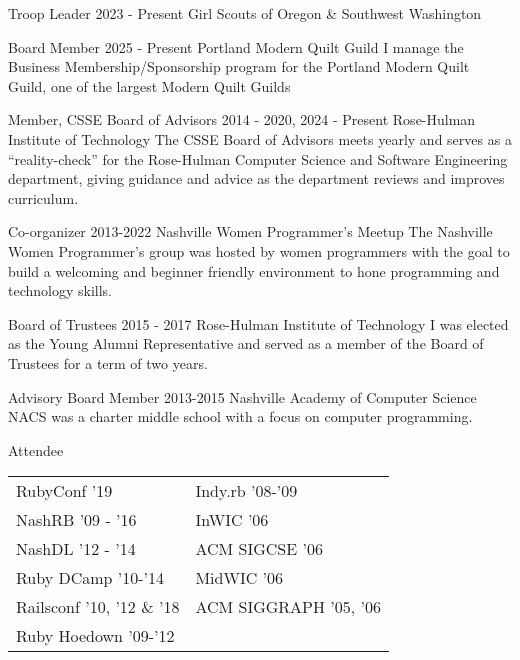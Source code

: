 
\begin{cventries}
  \cventry
    {Troop Leader}
    {2023 - Present}
    {Girl Scouts of Oregon \& Southwest Washington}
    {}
    {}

  \cventrywithcompanynote
    {Board Member}
    {2025 - Present }
    {Portland Modern Quilt Guild}
    {I manage the Business Membership/Sponsorship program for the Portland Modern Quilt Guild, one of the largest Modern Quilt Guilds}
    {}
    {}

  \cventrywithcompanynote
    {Member, CSSE Board of Advisors}
    {2014 - 2020, 2024 - Present}
    {Rose-Hulman Institute of Technology}
    {The CSSE Board of Advisors meets yearly and serves as a ``reality-check'' for the Rose-Hulman Computer Science and Software Engineering department, giving guidance and advice as the department reviews and improves curriculum.}
    {}
    {}

  \cventrywithcompanynote
    {Co-organizer}
    {2013-2022}
    {Nashville Women Programmer's Meetup}
    {The Nashville Women Programmer's group was hosted by women programmers with the goal to build a welcoming and beginner friendly environment to hone programming and technology skills.}
    {}
    {}

  \cventrywithcompanynote
    {Board of Trustees}
    {2015 - 2017}
    {Rose-Hulman Institute of Technology}
    {I was elected as the Young Alumni Representative and served as a member of the Board of Trustees for a term of two years.}
    {}
    {}

  \cventrywithcompanynote
    {Advisory Board Member}
    {2013-2015}
    {Nashville Academy of Computer Science}
    {NACS was a charter middle school with a focus on computer programming.}
    {}
    {}

  \cventry
    {Attendee}
    {}
    {}
    {}
    {}
    {
      \begin{tabular}[t]{@{} p{1.9in} p{1.9in} @{}}
        RubyConf '19  & Indy.rb '08-'09  \\
        NashRB '09 - '16 &  InWIC '06\\
        NashDL '12 - '14 & ACM SIGCSE '06 \\
        Ruby DCamp '10-'14 & MidWIC '06   \\
        Railsconf '10, '12 \& '18 & ACM SIGGRAPH '05, '06 \\
        Ruby Hoedown '09-'12
      \end{tabular}
    }


\end{cventries}
